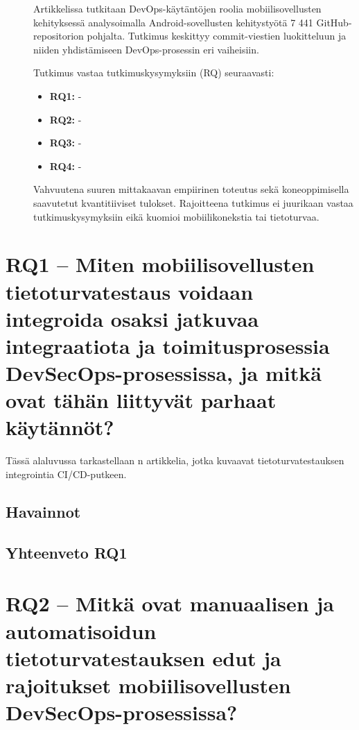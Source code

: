 \documentclass[bscthesis,finnish,oneside,biblatex]{uefcsthesis}
\begin{document}
\begin{description}
    \item[\cite{eramo2024empirical}] Artikkelissa tutkitaan DevOps-käytäntöjen roolia mobiilisovellusten kehityksessä analysoimalla Android-sovellusten kehitystyötä 7 441 GitHub-repositorion pohjalta. Tutkimus keskittyy commit-viestien luokitteluun ja niiden yhdistämiseen DevOps-prosessin eri vaiheisiin.

    Tutkimus vastaa tutkimuskysymyksiin (RQ) seuraavasti:
    \begin{itemize}
        \item \textbf{RQ1:} -
        \item \textbf{RQ2:} -
        \item \textbf{RQ3:} -
        \item \textbf{RQ4:} -
    \end{itemize}

    Vahvuutena suuren mittakaavan empiirinen toteutus sekä koneoppimisella saavutetut kvantitiiviset tulokset. Rajoitteena tutkimus ei juurikaan vastaa tutkimuskysymyksiin eikä kuomioi mobiilikonekstia tai tietoturvaa.
\end{description}

\section{RQ1 – Miten mobiilisovellusten tietoturvatestaus voidaan integroida osaksi jatkuvaa integraatiota ja toimitusprosessia DevSecOps-prosessissa, ja mitkä ovat tähän liittyvät parhaat käytännöt?}
\label{sec:rq1}

Tässä alaluvussa tarkastellaan n artikkelia, jotka kuvaavat
tietoturvatestauksen integrointia CI/CD-putkeen.

\subsection{Havainnot}

\subsection{Yhteenveto RQ1}

\section{RQ2 – Mitkä ovat manuaalisen ja automatisoidun tietoturvatestauksen edut ja rajoitukset mobiilisovellusten DevSecOps-prosessissa?}
\label{sec:rq2}
\end{document}
